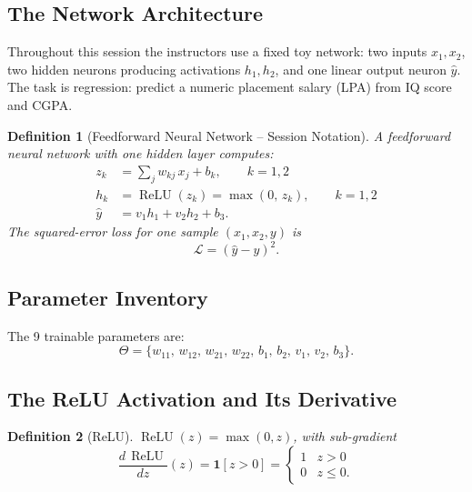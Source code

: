 \documentclass[12pt,a4paper]{article}
\newtheorem{definition}{Definition}[section]
\newcommand{\Loss}{\mathcal{L}}
\newcommand{\yhat}{\hat{y}}
\newcommand{\ReLU}{\operatorname{ReLU}}
\begin{document}
\subsection{The Network Architecture}

Throughout this session the instructors use a fixed toy network:
two inputs $x_1, x_2$, two hidden neurons producing activations $h_1, h_2$,
and one linear output neuron $\yhat$.
The task is regression: predict a numeric placement salary (LPA) from
IQ score and CGPA.

\begin{definition}[Feedforward Neural Network -- Session Notation]
\label{def:ffnn}
A \emph{feedforward neural network} with one hidden layer computes:
\begin{align}
  z_k &= \sum_j w_{kj}\,x_j + b_k, \qquad k=1,2 \label{eq:hidden-preact}\\
  h_k &= \ReLU(z_k) = \max(0,\, z_k), \qquad k=1,2 \label{eq:relu}\\
  \yhat &= v_1 h_1 + v_2 h_2 + b_3. \label{eq:output}
\end{align}
The squared-error loss for one sample $(x_1,x_2,y)$ is
\begin{equation}
  \Loss = (\yhat - y)^2. \label{eq:loss}
\end{equation}
\end{definition}

\subsection{Parameter Inventory}

The 9 trainable parameters are:
\[
  \Theta = \{w_{11},\, w_{12},\, w_{21},\, w_{22},\, b_1,\, b_2,\, v_1,\, v_2,\, b_3\}.
\]

\subsection{The ReLU Activation and Its Derivative}

\begin{definition}[ReLU]
\label{def:relu}
$\ReLU(z) = \max(0,z)$, with sub-gradient
\begin{equation}
  \frac{d\,\ReLU}{dz}(z) = \mathbf{1}[z > 0] =
  \begin{cases} 1 & z > 0 \\ 0 & z \leq 0. \end{cases}
  \label{eq:relu-deriv}
\end{equation}
\end{definition}
\end{document}
